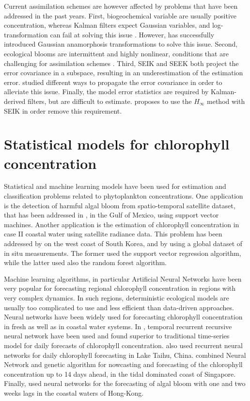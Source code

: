 Current assimilation schemes are however affected by problems that have been addressed in the past years. First, biogeochemical variable are usually positive concentration, whereas Kalman filters expect Gaussian variables, and log-transformation can fail at solving this issue \cite{Ciavatta2011}. However, \cite{Fontana2013} has successfully introduced Gaussian anamorphosis transformations to solve this issue. Second, ecological blooms are intermittent and highly nonlinear, conditions that are challenging for assimilation schemes \cite{Triantafyllou2012, Korres2012}. Third, SEIK and SEEK both project the error covariance in a subspace, resulting in an underestimation of the estimation error. \cite{Butenschon2012} studied different ways to propagate the error covariance in order to alleviate this issue. Finally, the model error statistics are required by Kalman-derived filters, but are difficult to estimate. \cite{Triantafyllou2012} proposes to use the $H_\infty$ method with SEIK in order remove this requirement.

\section{Statistical models for chlorophyll concentration}

Statistical and machine learning models have been used for estimation and classification problems related to phytoplankton concentrations. One application is the detection of harmful algal bloom from spatio-temporal satellite dataset, that has been addressed in \cite{Gokaraju2011}, in the Gulf of Mexico, using support vector machines. Another application is the estimation of chlorophyll concentration in case II coastal water using satellite radiance data. This problem has been addressed by \cite{Kim2014} on the west coast of South Korea, and by \cite{Camps-Valls2006} using a global dataset of in situ measurements. The former used the support vector regression algorithm, while the latter used also the random forest algorithm.

Machine learning algorithms, in particular Artificial Neural Networks have been very popular for forecasting regional chlorophyll concentration in regions with very complex dynamics. In such regions, deterministic ecological models are usually too complicated to use and less efficient than data-driven approaches. Neural networks have been widely used for forecasting chlorophyll concentration in fresh as well as in coastal water systems. In \cite{Jeong2006}, temporal recurrent recursive neural network have been used and found superior to traditional time-series model for daily forecasts of chlorophyll concentration. \cite{Wang2013} also used recurrent neural networks for daily chlorophyll forecasting in Lake Taihu, China. \cite{Mulia2013} combined Neural Network and genetic algorithm for nowcasting and forecasting of the chlorophyll concentration up to 14 days ahead, in the tidal dominated coast of Singapore. Finally, \cite{Lee2013} used neural networks for the forecasting of algal bloom with one and two weeks lags in the coastal waters of Hong-Kong.

